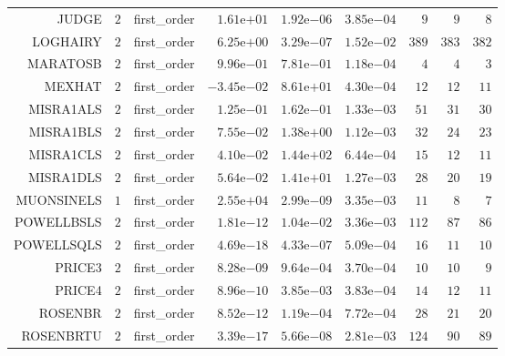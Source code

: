 \begin{longtable}{rrrrrrrrr}
JUDGE & \(     2\) & first\_order & \( 1.61\)e\(+01\) & \( 1.92\)e\(-06\) & \( 3.85\)e\(-04\) & \(     9\) & \(     9\) & \(     8\) \\
LOGHAIRY & \(     2\) & first\_order & \( 6.25\)e\(+00\) & \( 3.29\)e\(-07\) & \( 1.52\)e\(-02\) & \(   389\) & \(   383\) & \(   382\) \\
MARATOSB & \(     2\) & first\_order & \( 9.96\)e\(-01\) & \( 7.81\)e\(-01\) & \( 1.18\)e\(-04\) & \(     4\) & \(     4\) & \(     3\) \\
MEXHAT & \(     2\) & first\_order & \(-3.45\)e\(-02\) & \( 8.61\)e\(+01\) & \( 4.30\)e\(-04\) & \(    12\) & \(    12\) & \(    11\) \\
MISRA1ALS & \(     2\) & first\_order & \( 1.25\)e\(-01\) & \( 1.62\)e\(-01\) & \( 1.33\)e\(-03\) & \(    51\) & \(    31\) & \(    30\) \\
MISRA1BLS & \(     2\) & first\_order & \( 7.55\)e\(-02\) & \( 1.38\)e\(+00\) & \( 1.12\)e\(-03\) & \(    32\) & \(    24\) & \(    23\) \\
MISRA1CLS & \(     2\) & first\_order & \( 4.10\)e\(-02\) & \( 1.44\)e\(+02\) & \( 6.44\)e\(-04\) & \(    15\) & \(    12\) & \(    11\) \\
MISRA1DLS & \(     2\) & first\_order & \( 5.64\)e\(-02\) & \( 1.41\)e\(+01\) & \( 1.27\)e\(-03\) & \(    28\) & \(    20\) & \(    19\) \\
MUONSINELS & \(     1\) & first\_order & \( 2.55\)e\(+04\) & \( 2.99\)e\(-09\) & \( 3.35\)e\(-03\) & \(    11\) & \(     8\) & \(     7\) \\
POWELLBSLS & \(     2\) & first\_order & \( 1.81\)e\(-12\) & \( 1.04\)e\(-02\) & \( 3.36\)e\(-03\) & \(   112\) & \(    87\) & \(    86\) \\
POWELLSQLS & \(     2\) & first\_order & \( 4.69\)e\(-18\) & \( 4.33\)e\(-07\) & \( 5.09\)e\(-04\) & \(    16\) & \(    11\) & \(    10\) \\
PRICE3 & \(     2\) & first\_order & \( 8.28\)e\(-09\) & \( 9.64\)e\(-04\) & \( 3.70\)e\(-04\) & \(    10\) & \(    10\) & \(     9\) \\
PRICE4 & \(     2\) & first\_order & \( 8.96\)e\(-10\) & \( 3.85\)e\(-03\) & \( 3.83\)e\(-04\) & \(    14\) & \(    12\) & \(    11\) \\
ROSENBR & \(     2\) & first\_order & \( 8.52\)e\(-12\) & \( 1.19\)e\(-04\) & \( 7.72\)e\(-04\) & \(    28\) & \(    21\) & \(    20\) \\
ROSENBRTU & \(     2\) & first\_order & \( 3.39\)e\(-17\) & \( 5.66\)e\(-08\) & \( 2.81\)e\(-03\) & \(   124\) & \(    90\) & \(    89\) \\

\end{longtable}

